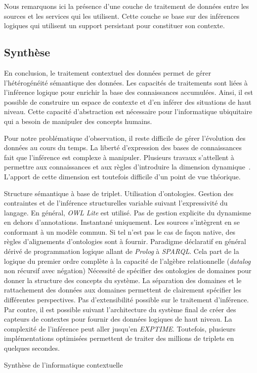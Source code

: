 Nous remarquons ici la présence d'une couche de traitement de données entre les sources et les services qui les utilisent. Cette couche se base sur des inférences logiques qui utilisent un support persistant pour constituer son contexte.

\subsection{Synthèse}
En conclusion, le traitement contextuel des données permet de gérer l'hétérogénéité sémantique des données. Les capacités de traitements sont liées à l'inférence logique pour enrichir la base des connaissances accumulées. Ainsi, il est possible de construire un espace de contexte et d'en inférer des situations de haut niveau. Cette capacité d'abstraction est nécessaire pour l'informatique ubiquitaire qui a besoin de manipuler des concepts humains.

Pour notre problématique d'observation, il reste difficile de gérer l'évolution des données au cours du temps. La liberté d'expression des bases de connaissances fait que l'inférence est complexe à manipuler. Plusieurs travaux s'attellent à permettre aux connaissances et aux règles d'introduire la dimension dynamique~\cite{Weikum:webknowledge, Hellerstein:declarative}. L'apport de cette dimension est toutefois difficile d'un point de vue théorique.

\begin{table}[!ht]
\criteretabDonnee
    {Structure sémantique à base de triplet.}
    {Utilisation d'ontologies. Gestion des contraintes et de l'inférence structurelles variable suivant l'expressivité du langage. En général, \textit{OWL Lite} est utilisé.}
    {Pas de gestion explicite du dynamisme en dehors d'annotations.}
\criteretabTraitement
    {Instantané uniquement.}
    {Les sources s'intègrent en se conformant à un modèle commun. Si tel n'est pas le cas de façon native, des règles d'alignements d'ontologies sont à fournir.}
    {Paradigme déclaratif en général dérivé de programmation logique allant de \textit{Prolog} à \textit{SPARQL}.}
    {Cela part de la logique du premier ordre complète à la capacité de l'algèbre relationnelle (\textit{datalog} non récursif avec négation)}
\criteretabAdaptabilite
    {Nécessité de spécifier des ontologies de domaines pour donner la structure des concepts du système.}
    {La séparation des domaines et le rattachement des données aux domaines permettent de clairement spécifier les différentes perspectives.}
    {Pas d'extensibilité possible sur le traitement d'inférence. Par contre, il est possible suivant l'architecture du système final de créer des capteurs de contextes pour fournir des données logiques de haut niveau.}
    {La complexité de l'inférence peut aller jusqu'en \textit{EXPTIME}. Toutefois, plusieurs implémentations optimisées permettent de traiter des millions de triplets en quelques secondes.}
\caption{Synthèse de l'informatique contextuelle}\label{tab:rw:supervision:contexte:synthese}
\end{table}
